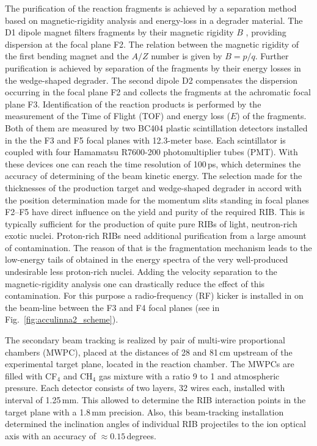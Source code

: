 The purification of the reaction fragments is achieved by a separation method based on magnetic-rigidity analysis and energy-loss in a degrader material. 
The D1 dipole magnet filters fragments by their magnetic rigidity $B$ , providing dispersion at the focal plane F2. 
The relation between the magnetic rigidity of the first bending magnet and the $A/Z$ number is given by $B=p/q$. 
Further purification is achieved by separation of the fragments by their energy losses in the wedge-shaped degrader. 
The second dipole D2 compensates the dispersion occurring in the focal plane F2 and collects the fragments at the achromatic focal plane F3. 
Identification of the reaction products is performed by the measurement of the Time of Flight (TOF) and energy
loss ($E$) of the fragments.
Both of them are measured by two BC404 plastic scintillation detectors installed in the the F3 and F5 focal planes with 12.3-meter base. 
Each scintillator is coupled with four Hamamatsu R7600-200 photomultiplier tubes (PMT). 
With these devices one can reach the time resolution of 100\,ps, which determines the accuracy of determining of the beam kinetic energy.
The selection made for the thicknesses of the production target and wedge-shaped degrader in accord with the position determination made for the momentum slits standing in focal planes F2–F5 have direct influence on the yield and purity of the required RIB.
This is typically sufficient for the production of quite pure RIBs of light, neutron-rich exotic nuclei. Proton-rich RIBs need additional purification from a large amount of contamination. 
The reason of that is the fragmentation mechanism leads to the low-energy tails of obtained in the energy spectra of the very well-produced undesirable less proton-rich nuclei. 
Adding the velocity separation to the magnetic-rigidity analysis one can drastically reduce the effect of this contamination. 
For this purpose a radio-frequency (RF) kicker is installed in on the beam-line between the F3 and F4 focal planes (see in Fig.\ \ref{fig:acculinna2_scheme}). 

The secondary beam tracking is realized by pair of multi-wire proportional chambers (MWPC), placed at the distances of 28 and 81\,cm upstream of the experimental target plane, located in the reaction chamber.
The MWPCs are filled with CF$_{4}$ and CH$_{4}$ gas mixture with a ratio 9 to 1 and atmospheric pressure.
Each detector consists of two layers, 32 wires each, installed with interval of 1.25\,mm. 
This allowed to determine the RIB interaction points in the target plane with a 1.8\,mm  precision.
Also, this beam-tracking installation determined the inclination angles of individual RIB projectiles to the ion optical axis with an accuracy of $\approx 0.15 $\,degrees.


